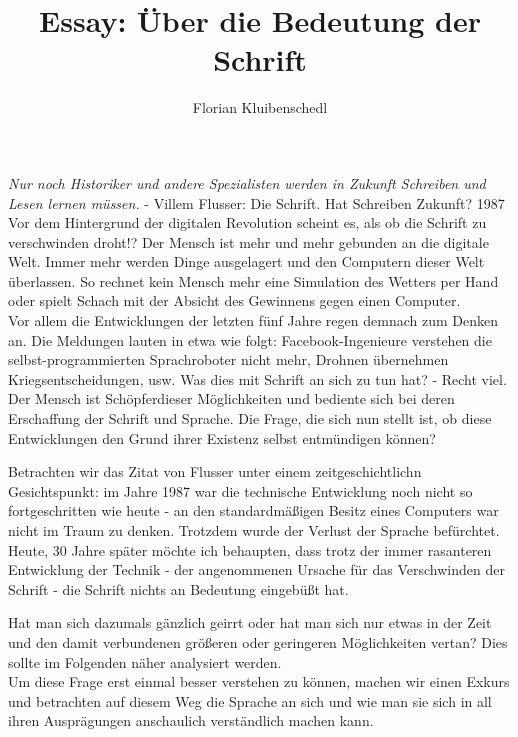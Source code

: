 \documentclass[12pt,a4paper,oneside]{article}
\author{Florian Kluibenschedl}
\title{Essay: Über die Bedeutung der Schrift}
\begin{document}
  \maketitle
  
  \textit{\glqq Nur noch Historiker und andere Spezialisten werden in Zukunft Schreiben und Lesen lernen müssen.\grqq} - Villem Flusser: Die Schrift. Hat Schreiben Zukunft? 1987 \\
  
  Vor dem Hintergrund der digitalen Revolution scheint es, als ob die Schrift zu verschwinden droht!? Der Mensch ist mehr und mehr gebunden an die digitale Welt. Immer mehr werden Dinge ausgelagert und den Computern dieser Welt überlassen. So rechnet kein Mensch mehr eine Simulation des Wetters per Hand oder spielt Schach mit der Absicht des Gewinnens gegen einen Computer.\\
  
  Vor allem die Entwicklungen der letzten fünf Jahre regen demnach zum Denken an. Die Meldungen lauten in etwa wie folgt: Facebook-Ingenieure verstehen die selbst-programmierten Sprachroboter nicht mehr, Drohnen übernehmen Kriegsentscheidungen, usw. Was dies mit Schrift an sich zu tun hat? - Recht viel. Der Mensch ist \glqq Schöpfer\grqq dieser Möglichkeiten und bediente sich bei deren Erschaffung der Schrift und Sprache. Die Frage, die sich nun stellt ist, ob diese Entwicklungen den Grund ihrer Existenz selbst entmündigen können?
  
  Betrachten wir das Zitat von Flusser unter einem zeitgeschichtlichn Gesichtspunkt: im Jahre 1987 war die technische Entwicklung noch nicht so fortgeschritten wie heute - an den standardmäßigen Besitz eines Computers war nicht im Traum zu denken. Trotzdem wurde der Verlust der Sprache befürchtet. Heute, 30 Jahre später möchte ich behaupten, dass trotz der immer rasanteren Entwicklung der Technik - der angenommenen Ursache für das Verschwinden der Schrift - die Schrift nichts an Bedeutung eingebüßt hat.
  
  Hat man sich dazumals gänzlich geirrt oder hat man sich nur etwas in der Zeit und den damit verbundenen größeren oder geringeren Möglichkeiten vertan? Dies sollte im Folgenden näher analysiert werden. \\
  
  Um diese Frage erst einmal besser verstehen zu können, machen wir einen Exkurs und betrachten auf diesem Weg die Sprache an sich und wie man sie sich in all ihren Ausprägungen anschaulich verständlich machen kann.
  
\end{document}
